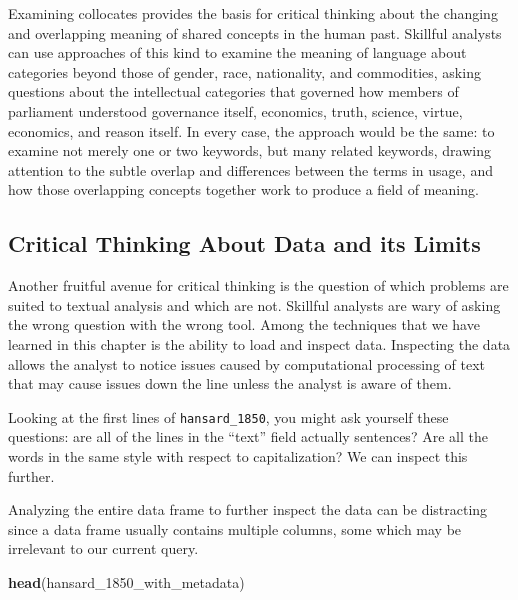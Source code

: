 \documentclass[
]{article}
\newenvironment{Shaded}{\begin{snugshade}}{\end{snugshade}}
\newcommand{\FunctionTok}[1]{\textcolor[rgb]{0.13,0.29,0.53}{\textbf{#1}}}
\newcommand{\NormalTok}[1]{#1}
\begin{document}
Examining collocates provides the basis for critical thinking about the
changing and overlapping meaning of shared concepts in the human past.
Skillful analysts can use approaches of this kind to examine the meaning
of language about categories beyond those of gender, race, nationality,
and commodities, asking questions about the intellectual categories that
governed how members of parliament understood governance itself,
economics, truth, science, virtue, economics, and reason itself. In
every case, the approach would be the same: to examine not merely one or
two keywords, but many related keywords, drawing attention to the subtle
overlap and differences between the terms in usage, and how those
overlapping concepts together work to produce a field of meaning.

\subsection{Critical Thinking About Data and its
Limits}\label{critical-thinking-about-data-and-its-limits}

Another fruitful avenue for critical thinking is the question of which
problems are suited to textual analysis and which are not. Skillful
analysts are wary of asking the wrong question with the wrong tool.
Among the techniques that we have learned in this chapter is the ability
to load and inspect data. Inspecting the data allows the analyst to
notice issues caused by computational processing of text that may cause
issues down the line unless the analyst is aware of them.

Looking at the first lines of \texttt{hansard\_1850}, you might ask
yourself these questions: are all of the lines in the ``text'' field
actually sentences? Are all the words in the same style with respect to
capitalization? We can inspect this further.

Analyzing the entire data frame to further inspect the data can be
distracting since a data frame usually contains multiple columns, some
which may be irrelevant to our current query.

\begin{Shaded}
\begin{Highlighting}[]
\FunctionTok{head}\NormalTok{(hansard\_1850\_with\_metadata)}
\end{Highlighting}
\end{Shaded}
\end{document}
